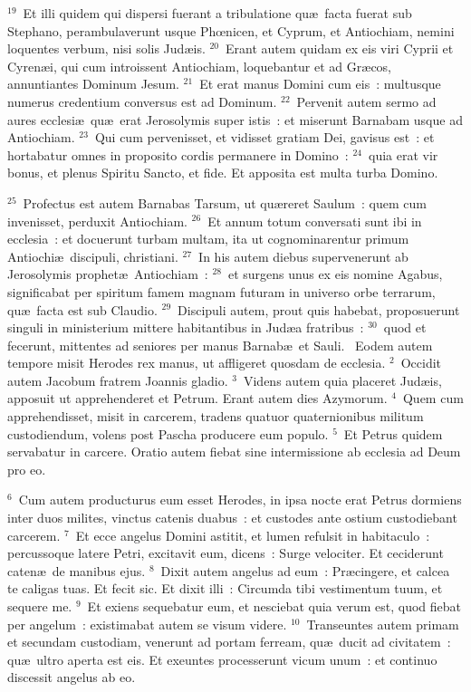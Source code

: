 ${}^{19}$~Et illi quidem qui dispersi fuerant a tribulatione qu\ae\ facta fuerat sub Stephano, perambulaverunt usque Phœnicen, et Cyprum, et Antiochiam, nemini loquentes verbum, nisi solis Jud\ae is.
${}^{20}$~Erant autem quidam ex eis viri Cyprii et Cyren\ae i, qui cum introissent Antiochiam, loquebantur et ad Gr\ae cos, annuntiantes Dominum Jesum.
${}^{21}$~Et erat manus Domini cum eis~: multusque numerus credentium conversus est ad Dominum.
${}^{22}$~Pervenit autem sermo ad aures ecclesi\ae\ qu\ae\ erat Jerosolymis super istis~: et miserunt Barnabam usque ad Antiochiam.
${}^{23}$~Qui cum pervenisset, et vidisset gratiam Dei, gavisus est~: et hortabatur omnes in proposito cordis permanere in Domino~:
${}^{24}$~quia erat vir bonus, et plenus Spiritu Sancto, et fide. Et apposita est multa turba Domino.


${}^{25}$~Profectus est autem Barnabas Tarsum, ut qu\ae reret Saulum~: quem cum invenisset, perduxit Antiochiam.
${}^{26}$~Et annum totum conversati sunt ibi in ecclesia~: et docuerunt turbam multam, ita ut cognominarentur primum Antiochi\ae\ discipuli, christiani.
${}^{27}$~In his autem diebus supervenerunt ab Jerosolymis prophet\ae\ Antiochiam~:
${}^{28}$~et surgens unus ex eis nomine Agabus, significabat per spiritum famem magnam futuram in universo orbe terrarum, qu\ae\ facta est sub Claudio.
${}^{29}$~Discipuli autem, prout quis habebat, proposuerunt singuli in ministerium mittere habitantibus in Jud\ae a fratribus~:
${}^{30}$~quod et fecerunt, mittentes ad seniores per manus Barnab\ae\ et Sauli.
~Eodem autem tempore misit Herodes rex manus, ut affligeret quosdam de ecclesia.
${}^{2}$~Occidit autem Jacobum fratrem Joannis gladio.
${}^{3}$~Videns autem quia placeret Jud\ae is, apposuit ut apprehenderet et Petrum. Erant autem dies Azymorum.
${}^{4}$~Quem cum apprehendisset, misit in carcerem, tradens quatuor quaternionibus militum custodiendum, volens post Pascha producere eum populo.
${}^{5}$~Et Petrus quidem servabatur in carcere. Oratio autem fiebat sine intermissione ab ecclesia ad Deum pro eo.


${}^{6}$~Cum autem producturus eum esset Herodes, in ipsa nocte erat Petrus dormiens inter duos milites, vinctus catenis duabus~: et custodes ante ostium custodiebant carcerem.
${}^{7}$~Et ecce angelus Domini astitit, et lumen refulsit in habitaculo~: percussoque latere Petri, excitavit eum, dicens~: Surge velociter. Et ceciderunt caten\ae\ de manibus ejus.
${}^{8}$~Dixit autem angelus ad eum~: Pr\ae cingere, et calcea te caligas tuas. Et fecit sic. Et dixit illi~: Circumda tibi vestimentum tuum, et sequere me.
${}^{9}$~Et exiens sequebatur eum, et nesciebat quia verum est, quod fiebat per angelum~: existimabat autem se visum videre.
${}^{10}$~Transeuntes autem primam et secundam custodiam, venerunt ad portam ferream, qu\ae\ ducit ad civitatem~: qu\ae\ ultro aperta est eis. Et exeuntes processerunt vicum unum~: et continuo discessit angelus ab eo.


